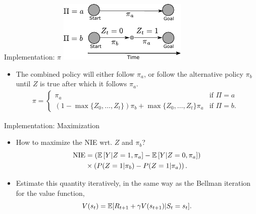 \note[itemize]{
    \item 
}

\begin{frame}{Implementation: $\pi$}
	\centering
	\includegraphics[width=0.4\linewidth]{causal_figures/medanal3}

	\begin{itemize}
    	\item The combined policy will either follow $\pi_a$, or follow the alternative policy $\pi_b$ until $Z$ is true after which it follows $\pi_a$. 
    \begin{align*}
    	\pi = \begin{cases} \pi_a & \mbox{if $\Pi = a$ } \\ \left(1-\max\{Z_{0}, \dots, Z_t\} \right)\pi_b +\max\{Z_{0}, \dots, Z_t\} \pi_a
    		& \mbox{if $\Pi = b$. }\end{cases} %
    \end{align*}
	\end{itemize}	
\end{frame}


\begin{frame}{Implementation: Maximization}
    \begin{itemize}
    	\item How to maximize the NIE wrt. $Z$ and $\pi_b$?
    	\begin{align*}
    		\mathrm{NIE} & = \left( \E\left[Y | Z=1, \pi_a \right] - \E\left[Y | Z=0, \pi_a \right] \right)  \\  
    		& \times  \left( P(Z=1| \pi_b) -P(Z=1| \pi_a) \right).%
    	\end{align*}
    \item Estimate this quantity iteratively, in the same way as the Bellman iteration for the value function,
    \begin{equation*}
        V(s_{t} ) = \operatorname{\mathbb{E}}[ R_{t+1} + \gamma V(s_{t+1}) | S_t=s_t].
    \end{equation*}

    \end{itemize}
\end{frame}


